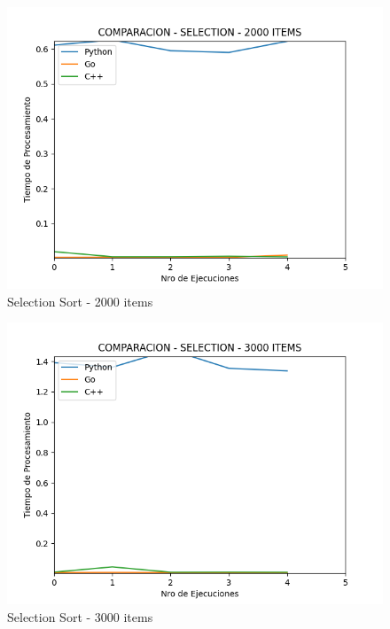 \documentclass[12pt]{article} %
\begin{document}
    \vspace{5mm}
    
    \begin{figure}[H]
    \centering
    \includegraphics[width=\textwidth]{selection_2000}
    \caption{Selection Sort - 2000 items}
    \end{figure}
    
    \vspace{5mm}
    
    \begin{figure}[H]
    \centering
    \includegraphics[width=\textwidth]{selection_3000}
    \caption{Selection Sort - 3000 items}
    \end{figure}
    
\end{document}
